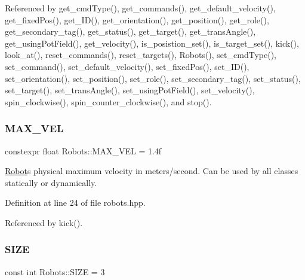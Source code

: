 Referenced by get\+\_\+cmd\+Type(), get\+\_\+commands(), get\+\_\+default\+\_\+velocity(), get\+\_\+fixed\+Pos(), get\+\_\+\+I\+D(), get\+\_\+orientation(), get\+\_\+position(), get\+\_\+role(), get\+\_\+secondary\+\_\+tag(), get\+\_\+status(), get\+\_\+target(), get\+\_\+trans\+Angle(), get\+\_\+using\+Pot\+Field(), get\+\_\+velocity(), is\+\_\+posistion\+\_\+set(), is\+\_\+target\+\_\+set(), kick(), look\+\_\+at(), reset\+\_\+commands(), reset\+\_\+targets(), Robots(), set\+\_\+cmd\+Type(), set\+\_\+command(), set\+\_\+default\+\_\+velocity(), set\+\_\+fixed\+Pos(), set\+\_\+\+I\+D(), set\+\_\+orientation(), set\+\_\+position(), set\+\_\+role(), set\+\_\+secondary\+\_\+tag(), set\+\_\+status(), set\+\_\+target(), set\+\_\+trans\+Angle(), set\+\_\+using\+Pot\+Field(), set\+\_\+velocity(), spin\+\_\+clockwise(), spin\+\_\+counter\+\_\+clockwise(), and stop().

\mbox{\label{class_robots_aef695d1329ee9902311720afdfa095a1}} 
\subsubsection{\texorpdfstring{M\+A\+X\+\_\+\+V\+EL}{MAX\_VEL}}
{\footnotesize\ttfamily constexpr float Robots\+::\+M\+A\+X\+\_\+\+V\+EL = 1.\+4f\hspace{0.3cm}{\ttfamily [static]}}



\hyperlink{struct_robots_1_1_robot}{Robot}\textquotesingle{}s physical maximum velocity in meters/second. Can be used by all classes statically or dynamically. 



Definition at line 24 of file robots.\+hpp.



Referenced by kick().

\mbox{\label{class_robots_ae9df2f1d345ad6740f0459956cdd4712}} 
\subsubsection{\texorpdfstring{S\+I\+ZE}{SIZE}}
{\footnotesize\ttfamily const int Robots\+::\+S\+I\+ZE = 3\hspace{0.3cm}{\ttfamily [static]}}



